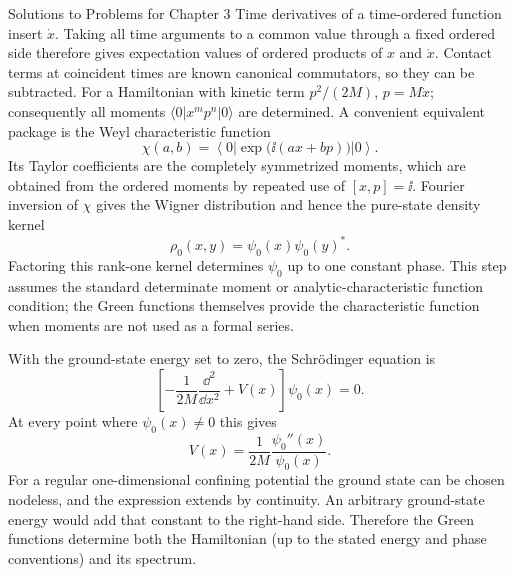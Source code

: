 \begin{bankssolutions}{Solutions to Problems for Chapter 3}
Time derivatives of a time-ordered function insert $\dot x$.  Taking all time
arguments to a common value through a fixed ordered side therefore gives
expectation values of ordered products of $x$ and $\dot x$.  Contact terms at
coincident times are known canonical commutators, so they can be subtracted.
For a Hamiltonian with kinetic term $p^2/(2M)$, $p=M\dot x$; consequently all
moments $\langle0|x^m p^n|0\rangle$ are determined.  A convenient equivalent
package is the Weyl characteristic function
\begin{equation*}
 \chi(a,b)=\left\langle0\left|\exp\!\bigl(\ii(ax+bp)\bigr)\right|0\right\rangle.
\end{equation*}
Its Taylor coefficients are the completely symmetrized moments, which are
obtained from the ordered moments by repeated use of $[x,p]=\ii$.  Fourier
inversion of $\chi$ gives the Wigner distribution and hence the pure-state
density kernel
\begin{equation*}
 \rho_0(x,y)=\psi_0(x)\psi_0(y)^*.
\end{equation*}
Factoring this rank-one kernel determines $\psi_0$ up to one constant phase.
This step assumes the standard determinate moment or analytic-characteristic
function condition; the Green functions themselves provide the characteristic
function when moments are not used as a formal series.

With the ground-state energy set to zero, the Schrödinger equation is
\begin{equation*}
 \left[-\frac{1}{2M}\frac{\dd^2}{\dd x^2}+V(x)\right]\psi_0(x)=0.
\end{equation*}
At every point where $\psi_0(x)\ne0$ this gives
\begin{equation*}
 V(x)=\frac{1}{2M}\frac{\psi_0''(x)}{\psi_0(x)}.
\end{equation*}
For a regular one-dimensional confining potential the ground state can be
chosen nodeless, and the expression extends by continuity.  An arbitrary
ground-state energy would add that constant to the right-hand side.  Therefore
the Green functions determine both the Hamiltonian (up to the stated energy and
phase conventions) and its spectrum.


\end{bankssolutions}
